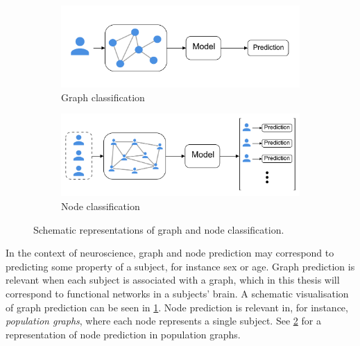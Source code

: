 \begin{figure}[!htbp]
    \centering
        \begin{subfigure}{.5\textwidth}
            \centering
            \includegraphics[width=0.95\linewidth]{chapters/images_theory/graph_classification_v2.png}
            \caption{Graph classification}
            \label{fig:subject_prediction}
        \end{subfigure}%
        \begin{subfigure}{.5\textwidth}
            \centering
            \includegraphics[width=0.95\linewidth]{chapters/images_theory/population_node_classification.png}
            \caption{Node classification}
            \label{fig:population_prediction}
        \end{subfigure}
    \caption{Schematic representations of graph and node classification.}
    \label{fig:graph_and_node_class}
\end{figure}

In the context of neuroscience, graph and node prediction may correspond to predicting some property of a subject, for instance sex or age. Graph prediction is relevant when each subject is associated with a graph, which in this thesis will correspond to functional networks in a subjects' brain. A schematic visualisation of graph prediction can be seen in \cref{fig:subject_prediction}. Node prediction is relevant in, for instance, \textit{population graphs}, where each node represents a single subject. See \cref{fig:population_prediction} for a representation of node prediction in population graphs. 


